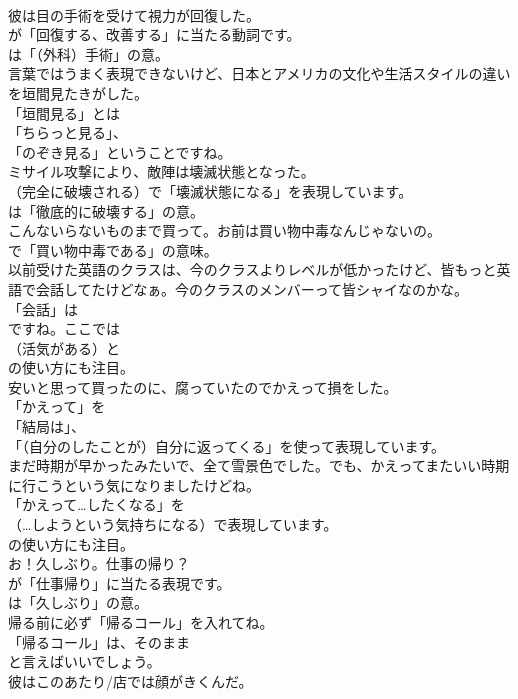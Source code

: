 \documentclass[8pt]{extreport}
\begin{document}
\begin{CJK}{UTF8}{min}
\\	彼は目の手術を受けて視力が回復した。 
\\	が「回復する、改善する」に当たる動詞です。
\\	は「（外科）手術」の意。	
\\	言葉ではうまく表現できないけど、日本とアメリカの文化や生活スタイルの違いを垣間見たきがした。 
\\	「垣間見る」とは
\\	「ちらっと見る」、
\\	「のぞき見る」ということですね。	
\\	ミサイル攻撃により、敵陣は壊滅状態となった。 
\\	（完全に破壊される）で「壊滅状態になる」を表現しています。
\\	は「徹底的に破壊する」の意。	
\\	こんないらないものまで買って。お前は買い物中毒なんじゃないの。 
\\	で「買い物中毒である」の意味。	
\\	以前受けた英語のクラスは、今のクラスよりレベルが低かったけど、皆もっと英語で会話してたけどなぁ。今のクラスのメンバーって皆シャイなのかな。 
\\	「会話」は
\\	ですね。ここでは
\\	（活気がある）と
\\	の使い方にも注目。	
\\	安いと思って買ったのに、腐っていたのでかえって損をした。 
\\	「かえって」を
\\	「結局は」、
\\	「（自分のしたことが）自分に返ってくる」を使って表現しています。	
\\	まだ時期が早かったみたいで、全て雪景色でした。でも、かえってまたいい時期に行こうという気になりましたけどね。 
\\	「かえって…したくなる」を 
\\	（…しようという気持ちになる）で表現しています。
\\	の使い方にも注目。	
\\	お！久しぶり。仕事の帰り？ 
\\	が「仕事帰り」に当たる表現です。
\\	は「久しぶり」の意。	
\\	帰る前に必ず「帰るコール」を入れてね。 
\\	「帰るコール」は、そのまま
\\	と言えばいいでしょう。	
\\	彼はこのあたり/店では顔がきくんだ。 

\end{CJK}
\end{document}
